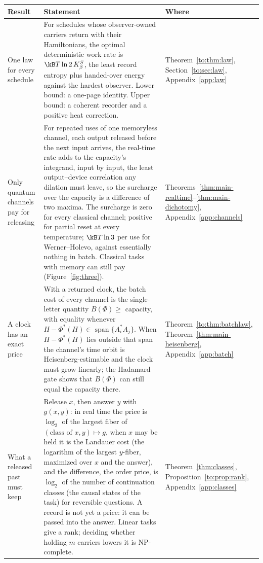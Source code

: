 \begin{table}[tbp]
\centering
\footnotesize
\begin{tabular}{@{}>{\raggedright\arraybackslash}p{3.1cm}>{\raggedright\arraybackslash}p{10.0cm}>{\raggedright\arraybackslash}p{2.5cm}@{}}
\toprule
Result & Statement & Where\\
\midrule
One law for every schedule & For schedules whose observer-owned carriers return with their Hamiltonians, the optimal deterministic work rate is $\kB T\ln2\,K_\beta^S$, the least record entropy plus handed-over energy against the hardest observer. Lower bound: a one-page identity. Upper bound: a coherent recorder and a positive heat correction. & Theorem~\ref{to:thm:law}, Section~\ref{to:sec:law}, Appendix~\ref{app:law}\\
Only quantum channels pay for releasing & For repeated uses of one memoryless channel, each output released before the next input arrives, the real-time rate adds to the capacity's integrand, input by input, the least output--device correlation any dilation must leave, so the surcharge over the capacity is a difference of two maxima. The surcharge is zero for every classical channel; positive for partial reset at every temperature; $\kB T\ln3$ per use for Werner--Holevo, against essentially nothing in batch. Classical tasks with memory can still pay (Figure~\ref{fig:three}). & Theorems~\ref{thm:main-realtime}--\ref{thm:main-dichotomy}, Appendix~\ref{app:channels}\\
A clock has an exact price & With a returned clock, the batch cost of every channel is the single-letter quantity $B(\Phi)\ge$ capacity, with equality whenever $H-\Phi^*(H)\in\operatorname{span}\{A_i^*A_j\}$. When $H-\Phi^*(H)$ lies outside that span the channel's time orbit is Heisenberg-estimable and the clock must grow linearly; the Hadamard gate shows that $B(\Phi)$ can still equal the capacity there. & Theorem~\ref{to:thm:batchlaw}, Theorem~\ref{thm:main-heisenberg}, Appendix~\ref{app:batch}\\
What a released past must keep & Release $x$, then answer $y$ with $g(x,y)$: in real time the price is $\log_2$ of the largest fiber of $(\text{class of }x,y)\mapsto g$, when $x$ may be held it is the Landauer cost (the logarithm of the largest $y$-fiber, maximized over $x$ and the answer), and the difference, the order price, is $\log_2$ of the number of continuation classes (the causal states of the task) for reversible questions. A record is not yet a price: it can be passed into the answer. Linear tasks give a rank; deciding whether holding $m$ carriers lowers it is NP-complete. & Theorem~\ref{thm:classes}, Proposition~\ref{to:prop:rank}, Appendix~\ref{app:classes}\\

\end{tabular}
\end{table}
